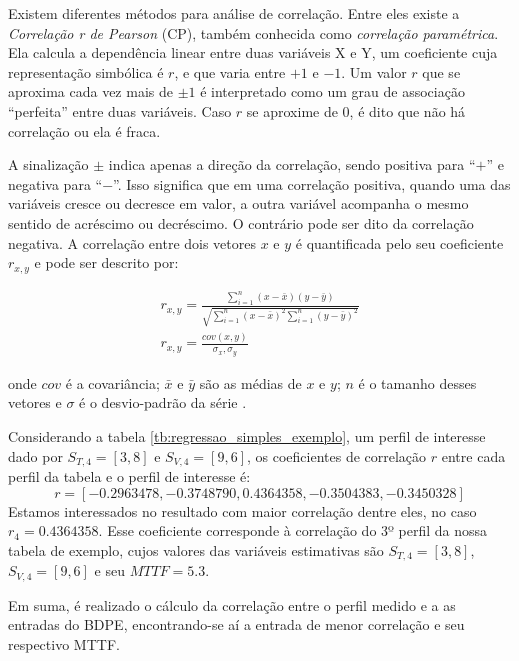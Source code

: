 Existem diferentes métodos para análise de correlação. Entre eles existe a \textit{Correlação r de Pearson} (CP), também conhecida como \textit{correlação paramétrica}. Ela calcula a dependência linear entre duas variáveis X e Y, um coeficiente cuja representação simbólica é $r$, e que varia entre $+1$ e $-1$. Um valor $r$ que se aproxima cada vez mais de $\pm1$ é interpretado como um grau de associação ``perfeita'' entre duas variáveis. Caso $r$ se aproxime de $0$, é dito que não há correlação ou ela é fraca.

A sinalização $\pm$ indica apenas a direção da correlação, sendo positiva para ``$+$'' e negativa para ``$-$''. Isso significa que em uma correlação positiva, quando uma das variáveis cresce ou decresce em valor, a outra variável acompanha o mesmo sentido de acréscimo ou decréscimo. O contrário pode ser dito da correlação negativa.
A correlação entre dois vetores $x$ e $y$ é quantificada pelo seu coeficiente $r_{x,y}$ e pode ser descrito por:

\begin{align}
r_{x,y}= \frac{\sum_{i=1}^{n}(x-\bar{x})(y-\bar{y})}{\sqrt{\sum_{i=1}^{n}(x-\bar{x})^2 \sum_{i=1}^{n}(y-\bar{y})^2}} \\
r_{x,y}=\frac{cov(x,y)}{\sigma_x,\sigma_y}
\label{eq:correlacao}
\end{align}

onde $cov$ é a covariância; $\bar{x}$ e $\bar{y}$ são as médias de $x$ e $y$; $n$ é o tamanho desses vetores e $\sigma$ é o desvio-padrão da série \cite{Chatterjee}.

Considerando a tabela \ref{tb:regressao_simples_exemplo}, um perfil de interesse dado por $S_{T,4} = [3,8]$ e $S_{V,4} = [9,6]$, os coeficientes de correlação $r$ entre cada perfil da tabela e o perfil de interesse é:
\begin{equation}
r = [-0.2963478, -0.3748790,  0.4364358, -0.3504383, -0.3450328]
\end{equation}
Estamos interessados no resultado com maior correlação dentre eles, no caso $r_4=0.4364358$. Esse coeficiente corresponde à correlação do 3º perfil da nossa tabela de exemplo, cujos valores das variáveis estimativas são $S_{T,4} = [3,8]$, $S_{V,4} = [9,6]$ e seu $MTTF=5.3$.

Em suma, é realizado o cálculo da correlação entre o perfil medido e a as entradas do BDPE, encontrando-se aí a entrada de menor correlação e seu respectivo MTTF.
